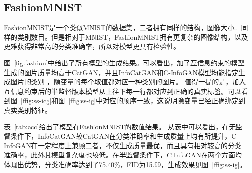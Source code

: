 

\subsection{FashionMNIST}\label{sec:fashion}

FashionMNIST\citep{xiao2017/online}是一个类似MNIST的数据集，二者拥有同样的结构，图像大小，同样的类别数目。但是相对于MNIST，FashionMNIST拥有更复杂的图像结构，以及更难获得非常高的分类准确率，所以对模型更具有检验性。

图~\ref{fig:fashion}中给出了所有模型的生成结果。可以看出，加了互信息约束的模型生成的图片质量均高于CatGAN，并且InfoCatGAN和C-InfoGAN模型均能指定生成图片的类别
，隐变量的每个取值都对应一种类别的图片。
值得一提的是，加入互信息约束后的半监督版本模型从上往下每一行都对应到正确的真实标签。可以看到图~\ref{ffig:ss-icg}和图~\ref{ffig:ss-ig}中对应的顺序一致，这说明隐变量已经正确绑定到真实类别特征。

表~\ref{tab:acc}给出了模型在FashionMNIST的数值结果。
从表中可以看出，在无监督条件下，InfoCatGAN较CatGAN在分类准确率和生成质量上均有所提升，C-InfoGAN在一定程度上兼顾二者，不仅生成质量最优，而且具有相对较高的分类准确率，此外其模型复杂度也较低。在半监督条件下，C-InfoGAN在两个方面均体现出优势，分类准确率达到了75.40\%，FID为15.99，生成效果见图~\ref{ffig:ss-ig}。

